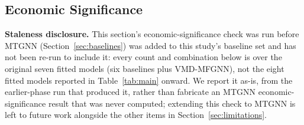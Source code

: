 \documentclass[journal]{IEEEtran}
\begin{document}
\subsection{Economic Significance}
\label{sec:econ}

\textbf{Staleness disclosure.} This section's economic-significance check was run before MTGNN (Section~\ref{sec:baselines}) was added to this study's baseline set and has not been re-run to include it: every count and combination below is over the original seven fitted models (six baselines plus VMD-MFGNN), not the eight fitted models reported in Table~\ref{tab:main} onward. We report it as-is, from the earlier-phase run that produced it, rather than fabricate an MTGNN economic-significance result that was never computed; extending this check to MTGNN is left to future work alongside the other items in Section~\ref{sec:limitations}.
\end{document}
